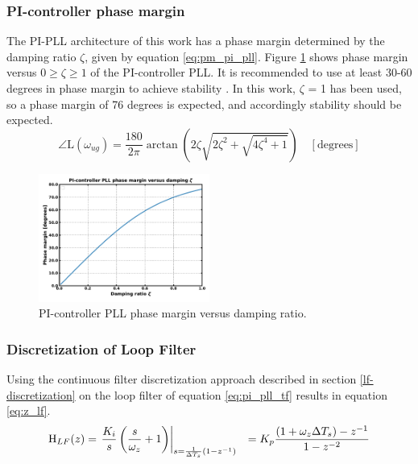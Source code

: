		\subsubsection{PI-controller phase margin}\label{pi_phase_margin}
			The PI-PLL architecture of this work has a phase margin determined by the damping ratio $\zeta$, given by equation \ref{eq:pm_pi_pll}. Figure \ref{fig:phase_margin} shows phase margin versus $0 \geq \zeta \geq 1$ of the PI-controller PLL. It is recommended to use at least 30-60 degrees in phase margin to achieve stability \cite{ogata_2010_stability}. In this work, $\zeta$ = 1 has been used, so a phase margin of 76 degrees is expected, and accordingly stability should be expected.
			\begin{equation}\label{eq:pm_pi_pll}
				\angle \text{L}(\omega_{ug}) = \frac{180}{2\pi}\arctan\left(2\zeta\sqrt{2\zeta^2 + \sqrt{4\zeta^4+1}}\right)\hspace{1em}[\text{degrees}]
			\end{equation}
			\begin{figure}[htb!]
				\center\includegraphics[width=0.5\textwidth, angle=0]{figs/damping_vs_pm.pdf}
				\caption{PI-controller PLL phase margin versus damping ratio.}
				\label{fig:phase_margin}
			\end{figure}



	\subsubsection{Discretization of Loop Filter}\label{disc_lf_comp_pi}
		Using the continuous filter discretization approach described in section \ref{lf-discretization} on the loop filter of equation \ref{eq:pi_pll_tf} results in equation \ref{eq:z_lf}.
		\begin{align}
			\textnormal{H}_{LF}(z) & = \left.\frac{K_i}{s}\left(\frac{s}{\omega_z} + 1\right)\right\vert_{s=\frac{1}{\Delta T_s}(1-z^{-1})}
			&= K_p\frac{(1+\omega_z\Delta T_s)-z^{-1}}{1- z^{-2}}\label{eq:z_lf}
		\end{align}

